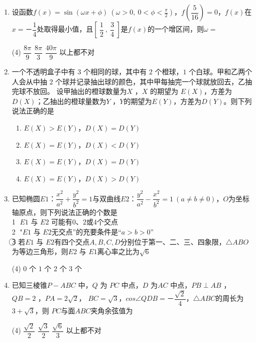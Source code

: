 \documentclass[11pt,a4paper]{ctexart}
\begin{document}
\begin{enumerate}
    \item 设函数$f(x)= \sin (\omega x+ \phi)\  (\omega  > 0,\ 0 < \phi < \frac{\pi}{2})$，$f (\dfrac{5}{16}) = 0$，$f(x)$在$x= －\dfrac{1}{4}$处取得最小值，且$[\ \dfrac{1}{2}\ ,\ \dfrac{3}{4}\ ]$是$f(x)$的一个增区间，则$ \omega =$
    \begin{tasks}(4)
        \task $\dfrac{8\pi}{9}$ 
        \task $\dfrac{8\pi}{3}$
        \task $\dfrac{40\pi}{9}$
        \task 以上都不对
    \end{tasks}

    \item 一个不透明盒子中有 $3$ 个相同的球，其中有 $2$ 个橙球，$1$ 个白球。甲和乙两个人会从中抽 $2$ 个球并记录抽出球的颜色，其中甲每抽完一个球就放回去，乙抽完球不放回。
    设甲抽出的橙球数量为$X$ ，$X$ 的期望为 $E(X)$，方差为$D(X)$；乙抽出的橙球量数为$Y$ ，$Y$的期望为$E(Y)$，方差为$D(Y)$。则下列说法正确的是  
    \begin{enumerate}[label=(\Alph*)]
        \item $E(X)>E(Y)$，$D(X)=D(Y)$
        \item $E(X)=E(Y)$，$D(X)<D(Y)$
        \item $E(X)=E(Y)$，$D(X)=D(Y)$
        \item $E(X)=E(Y)$，$D(X)>D(Y)$
    \end{enumerate}
    
\newpage
    \item 已知椭圆$E1$：$\dfrac{x^2}{a^2}+\dfrac{y^2}{b^2}=1$与双曲线$E2$：$\dfrac{y^2}{a^2}-\dfrac{x^2}{b^2}=1\ (a \neq b \neq 0)$，$O$为坐标轴原点，则下列说法正确的个数是\\
        \textcircled{1} $E1$ 与 $E2$ 可能有$0$、$2$或$4$个交点\\
        \textcircled{2} "$E1$ 与 $E2$无交点”的充要条件是“$a>b>0$”\\
        \textcircled{3} 若$E1$ 与 $E2$有四个交点$A,B,C,D$分别位于第一、二、三、四象限，$\triangle ABO$为等边三角形，则$E2$ 与 $E1$离心率之比为$\sqrt6$
    \begin{tasks}(4)
        \task $0$ 个
        \task $1$ 个
        \task $2$ 个
        \task $3$ 个
    \end{tasks}

    \item  已知三棱锥$P-ABC$ 中，$Q$ 为 $PC$ 中点，$D$ 为$AC$ 中点，$PB\perp AB$ ，$QB=2$ ，$PA=2\sqrt2$， $BC=\sqrt3$，$cos \angle  QDB=－\dfrac{\sqrt2}{4}$，$\triangle ABC$的周长为$3+\sqrt3$，则 $PC$与面$ABC$夹角余弦值为
    \begin{tasks}(4)
        \task $\dfrac{\sqrt2}{2}$ 
        \task $\dfrac{\sqrt 3}{2}$
        \task $\dfrac{\sqrt6}{3}$
        \task 以上都不对
    \end{tasks}


\end{enumerate}
\end{document}
